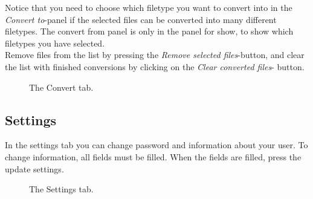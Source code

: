 Notice that you need to choose which filetype you want to convert into in the \textit{Convert to}-panel if the selected files can be converted into many different filetypes. The convert from panel is only in the panel for show, to show which filetypes you have selected. \\

Remove files from the list by pressing the \textit{Remove selected files}-button, and clear the list with finished conversions by clicking on the \textit{Clear converted files}- button.


 \begin{figure}[h!]
 \caption{The Convert tab.}
 \label{fig:des_convert}
 \end{figure}

\subsection{Settings}

In the settings tab  you can change password and information about your user. To change information, all fields must be filled. When the fields are filled, press the update settings.

 \begin{figure}[h!]
 \caption{The Settings tab.}
 \label{fig:des_settings}
 \end{figure}
